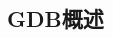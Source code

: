 \documentclass[class=book, crop=false]{standalone}
\begin{document}
\begin{CJK}{UTF8}{gbsn}

\chapter*{GDB概述}









\cleardoublepage

\end{CJK}
\end{document}
